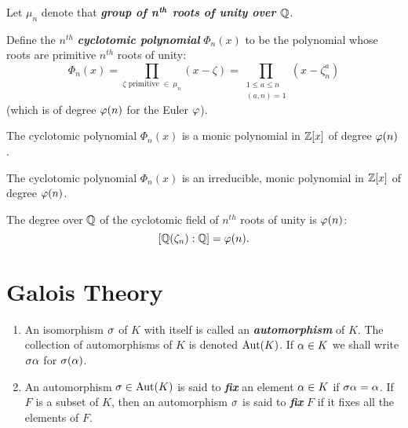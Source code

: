 \nl

\begin{defn}
Let $\mu_n$ denote that \textit{\textbf{group of n$^{\textbf{\textit{th}}}$ roots of unity over $\mathbb{Q}$}}.
\end{defn}

\nl

\begin{defn}
Define the $n^{th}$ \textit{\textbf{cyclotomic polynomial}} $\Phi_n(x)$ to be the polynomial whose roots are primitive $n^{th}$ roots of unity:
\[\Phi_n(x) = \prod_{\zeta\text{ primitive }\in\ \mu_n}(x - \zeta) = \prod_{\substack{1 \leq a \leq n \\ (a,n) = 1}} (x - \zeta_n^a)\]
(which is of degree $\varphi(n)$ for the Euler $\varphi$).
\end{defn}

\nl

\begin{lem}
The cyclotomic polynomial $\Phi_n(x)$ is a monic polynomial in $\mathbb{Z}[x]$ of degree $\varphi(n)$.
\end{lem}

\nl

\begin{thm}
The cyclotomic polynomial $\Phi_n(x)$ is an irreducible, monic polynomial in $\mathbb{Z}[x]$ of degree $\varphi(n)$.
\end{thm}

\nl

\begin{cor}
The degree over $\mathbb{Q}$ of the cyclotomic field of $n^{th}$ roots of unity is $\varphi(n)$:
\[[\mathbb{Q}(\zeta_n): \mathbb{Q}] = \varphi(n).\]
\end{cor}



\section{Galois Theory}
\setcounter{thm}{0}

\begin{defn}\nl
\begin{enumerate}
\item An isomorphism $\sigma$ of $K$ with itself is called an \textit{\textbf{automorphism}} of $K$. The collection of automorphisms of $K$ is denoted $\text{Aut}(K)$. If $\alpha\in K$ we shall write $\sigma\alpha$ for $\sigma(\alpha)$.
\item An automorphism $\sigma\in \text{Aut}(K)$ is said to \textit{\textbf{fix}} an element $\alpha\in K$ if $\sigma\alpha = \alpha$. If $F$ is a subset of $K$, then an automorphism $\sigma$ is said to \textit{\textbf{fix}} $F$ if it fixes all the elements of $F$. 
\end{enumerate}
\end{defn}

